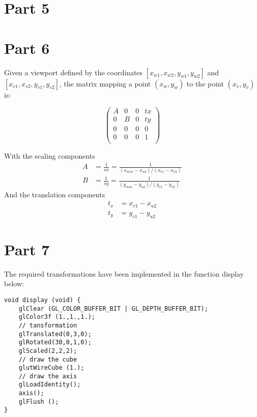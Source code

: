




\section{Part 5}


\section{Part 6}


Given a viewport defined by the coordinates $[x_{w1},x_{w2},y_{w1},y_{w2}]$ and $[x_{v1},x_{v2},y_{v1},y_{v2}]$,
the matrix mapping a point $(x_{w},y_{w})$ to the point $(x_{v},y_{v})$
 is:


$$
\begin{pmatrix}
    A& 0& 0& tx \\
    0& B& 0& ty \\
    0& 0& 0& 0 \\
    0& 0& 0& 1 \\
\end{pmatrix}
$$

With the scaling components\\
\begin{align*}
    A &= \frac{1}{sx} = \frac{1}{(x_{min}-x_{u2})/(x_{v1}-x_{v2})} \\
    B &= \frac{1}{sy} = \frac{1}{(y_{min}-y_{u2})/(y_{v1}-y_{v2})}
\end{align*}
And the translation components\\
\begin{align*}
   t_x &= x_{v1}-x_{u2} \\
   t_y &= y_{v1}-y_{u2} 
\end{align*}

\section{Part 7}
The required transformations have been implemented in the function display below:
\begin{lstlisting}[caption=Snapshot from Part7.cpp]
void display (void) {
    glClear (GL_COLOR_BUFFER_BIT | GL_DEPTH_BUFFER_BIT);
    glColor3f (1.,1.,1.);
    // tansformation
    glTranslated(0,3,0);
    glRotated(30,0,1,0);
    glScaled(2,2,2);
    // draw the cube
    glutWireCube (1.);
    // draw the axis 
    glLoadIdentity();
    axis();
    glFlush ();
}
\end{lstlisting}

